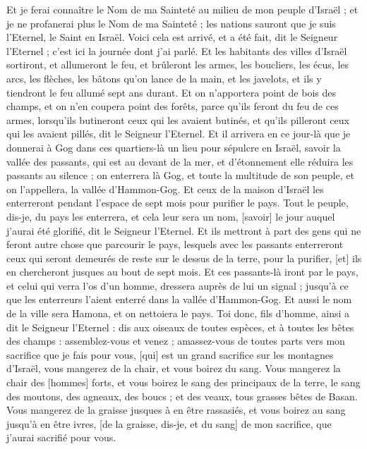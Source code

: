 \begin{multicols}{2}
Et je ferai connaître le Nom de ma Sainteté au milieu de mon peuple d'Israël ; et je ne profanerai plus le Nom de ma Sainteté ; les nations sauront que je suis l'Eternel, le Saint en Israël.
Voici cela est arrivé, et a été fait, dit le Seigneur l'Eternel ; c'est ici la journée dont j'ai parlé.
Et les habitants des villes d'Israël sortiront, et allumeront le feu, et brûleront les armes, les boucliers, les écus, les arcs, les flèches, les bâtons qu'on lance de la main, et les javelots, et ils y tiendront le feu allumé sept ans durant.
Et on n'apportera point de bois des champs, et on n'en coupera point des forêts, parce qu'ils feront du feu de ces armes, lorsqu'ils butineront ceux qui les avaient butinés, et qu'ils pilleront ceux qui les avaient pillés, dit le Seigneur l'Eternel.
Et il arrivera en ce jour-là que je donnerai à Gog dans ces quartiers-là un lieu pour sépulcre en Israël, savoir la vallée des passants, qui est au devant de la mer, et d'étonnement elle réduira les passants au silence ; on enterrera là Gog, et toute la multitude de son peuple, et on l'appellera, la vallée d'Hammon-Gog.
Et ceux de la maison d'Israël les enterreront pendant l'espace de sept mois pour purifier le pays.
Tout le peuple, dis-je, du pays les enterrera, et cela leur sera un nom, [savoir] le jour auquel j'aurai été glorifié, dit le Seigneur l'Eternel.
Et ils mettront à part des gens qui ne feront autre chose que parcourir le pays, lesquels avec les passants enterreront ceux qui seront demeurés de reste sur le dessus de la terre, pour la purifier, [et] ils en chercheront jusques au bout de sept mois.
Et ces passants-là iront par le pays, et celui qui verra l'os d'un homme, dressera auprès de lui un signal ; jusqu'à ce que les enterreurs l'aient enterré dans la vallée d'Hammon-Gog.
Et aussi le nom de la ville sera Hamona, et on nettoiera le pays.
Toi donc, fils d'homme, ainsi a dit le Seigneur l'Eternel : dis aux oiseaux de toutes espèces, et à toutes les bêtes des champs : assemblez-vous et venez ; amassez-vous de toutes parts vers mon sacrifice que je fais pour vous, [qui] est un grand sacrifice sur les montagnes d'Israël, vous mangerez de la chair, et vous boirez du sang.
Vous mangerez la chair des [hommes] forts, et vous boirez le sang des principaux de la terre, le sang des moutons, des agneaux, des boucs ; et des veaux, tous grasses bêtes de Basan.
Vous mangerez de la graisse jusques à en être rassasiés, et vous boirez au sang jusqu'à en être ivres, [de la graisse, dis-je, et du sang] de mon sacrifice, que j'aurai sacrifié pour vous.

\end{multicols}
